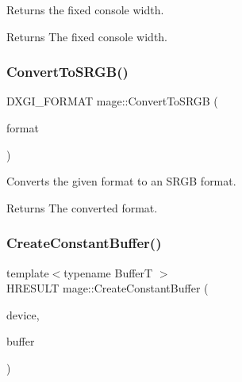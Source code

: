 Returns the fixed console width.

\begin{DoxyReturn}{Returns}
The fixed console width. 
\end{DoxyReturn}
\hypertarget{namespacemage_a9d84163ab692956f5f4537a965238a09}{}\label{namespacemage_a9d84163ab692956f5f4537a965238a09} 
\subsubsection{\texorpdfstring{Convert\+To\+S\+R\+G\+B()}{ConvertToSRGB()}}
{\footnotesize\ttfamily D\+X\+G\+I\+\_\+\+F\+O\+R\+M\+AT mage\+::\+Convert\+To\+S\+R\+GB (\begin{DoxyParamCaption}\item[{D\+X\+G\+I\+\_\+\+F\+O\+R\+M\+AT}]{format }\end{DoxyParamCaption})}

Converts the given format to an S\+R\+GB format.

\begin{DoxyReturn}{Returns}
The converted format. 
\end{DoxyReturn}
\hypertarget{namespacemage_a1dcb7f4d72102abcc6ab115aa6ca3695}{}\label{namespacemage_a1dcb7f4d72102abcc6ab115aa6ca3695} 
\subsubsection{\texorpdfstring{Create\+Constant\+Buffer()}{CreateConstantBuffer()}}
{\footnotesize\ttfamily template$<$typename BufferT $>$ \\
H\+R\+E\+S\+U\+LT mage\+::\+Create\+Constant\+Buffer (\begin{DoxyParamCaption}\item[{\hyperlink{namespacemage_ae74f374780900893caa5555d1031fd79}{Com\+Ptr}$<$ I\+D3\+D11\+Device2 $>$}]{device,  }\item[{I\+D3\+D11\+Buffer $\ast$$\ast$}]{buffer }\end{DoxyParamCaption})}

\hypertarget{namespacemage_a47717f8390dbceacee1fbbd98ccf20ec}{}\label{namespacemage_a47717f8390dbceacee1fbbd98ccf20ec} 
